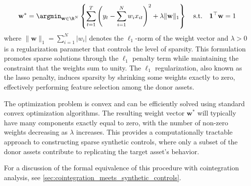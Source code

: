\begin{equation*}
\mathbf{w}^* = \argmin_{\mathbf{w} \in \R^{N}} \left\{\sum_{t=1}^T \left(y_{t} - \sum_{i=1}^N w_i x_{it}\right)^2 + \lambda\|\mathbf{w}\|_1\right\}
\quad \text{s.t.} \quad \mathbf{1}^\top \mathbf{w} = 1
\end{equation*}
where $\|\mathbf{w}\|_1 = \sum_{i=1}^N |w_i|$ denotes the $\ell_1$-norm of the weight vector and $\lambda > 0$ is a regularization parameter that controls the level of sparsity. This formulation promotes sparse solutions through the $\ell_1$ penalty term while maintaining the constraint that the weights sum to unity. The $\ell_1$ regularization, also known as the lasso penalty, induces sparsity by shrinking some weights exactly to zero, effectively performing feature selection among the donor assets.

The optimization problem is convex and can be efficiently solved using standard convex optimization algorithms. The resulting weight vector $\mathbf{w}^*$ will typically have many components exactly equal to zero, with the number of non-zero weights decreasing as $\lambda$ increases. This provides a computationally tractable approach to constructing sparse synthetic controls, where only a subset of the donor assets contribute to replicating the target asset's behavior.


For a discussion of the formal equivalence of this procedure with cointegration analysis, see \cref{sec:cointegration_meets_synthetic_controls}.


